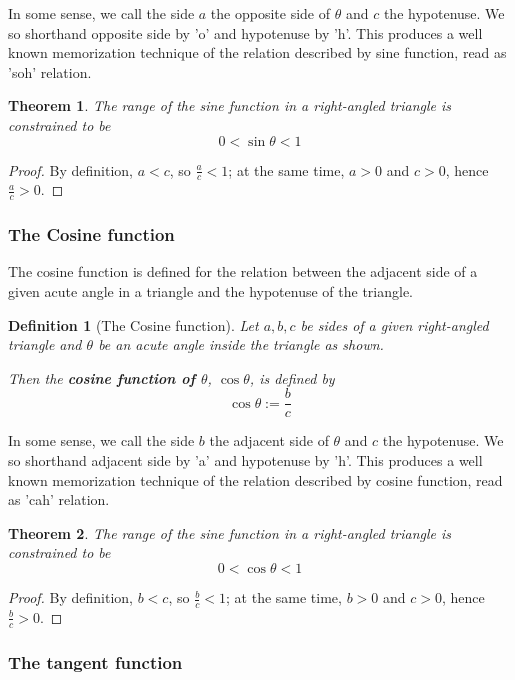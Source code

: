 \documentclass[12pt]{article}
\newtheorem{definition}{Definition}[section]
\newtheorem*{theorem}{Theorem}
\begin{document}
    In some sense, we call the side $a$ the opposite side of $\theta$ and $c$ the hypotenuse. We so shorthand opposite side by 'o' and hypotenuse by 'h'. This produces a well known memorization technique of the relation described by sine function, read as 'soh' relation.

    \begin{theorem}
        The range of the sine function in a right-angled triangle is constrained to be $$0<\sin{\theta}<1$$
    \end{theorem}

    \begin{proof}
        By definition, $a<c$, so $\frac{a}{c}<1$; at the same time, $a>0$ and $c>0$, hence $\frac{a}{c}>0$.
    \end{proof}

    \subsubsection*{The Cosine function}

    The cosine function is defined for the relation between the adjacent side of a given acute angle in a triangle and the hypotenuse of the triangle.

    \begin{definition}[The Cosine function]
        Let $a,b,c$ be sides of a given right-angled triangle and $\theta$ be an acute angle inside the triangle as shown.

        Then the \textbf{cosine function of $\theta$}, $\cos{\theta}$, is defined by $$\cos{\theta}:=\frac{b}{c}$$
    \end{definition}

    In some sense, we call the side $b$ the adjacent side of $\theta$ and $c$ the hypotenuse. We so shorthand adjacent side by 'a' and hypotenuse by 'h'. This produces a well known memorization technique of the relation described by cosine function, read as 'cah' relation.

    \begin{theorem}
        The range of the sine function in a right-angled triangle is constrained to be $$0<\cos{\theta}<1$$
    \end{theorem}

    \begin{proof}
        By definition, $b<c$, so $\frac{b}{c}<1$; at the same time, $b>0$ and $c>0$, hence $\frac{b}{c}>0$.
    \end{proof}

    \subsubsection*{The tangent function}
\end{document}
